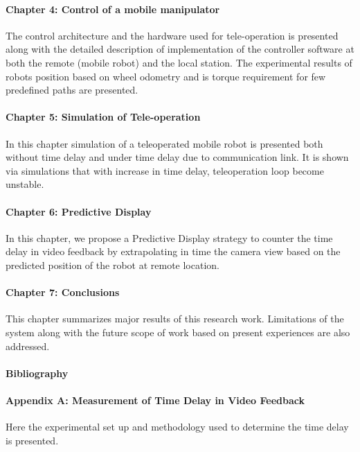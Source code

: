 \paragraph*{Chapter 4: Control of a mobile manipulator \\}
The control architecture and the hardware used for tele-operation is presented along with the detailed description of implementation of the controller software at both the remote (mobile robot)  and the local station. The experimental results of robots position based on wheel odometry and is torque requirement for few predefined paths are presented. 

\paragraph*{Chapter 5: Simulation of Tele-operation \\}
In this chapter simulation of a teleoperated mobile robot is presented both without time delay and  under time delay due to communication link. It is shown via simulations that with increase in time delay,  teleoperation loop become unstable. 
 
\paragraph*{Chapter 6: Predictive Display \\}
In this chapter,  we propose a Predictive Display strategy to counter the time delay in video feedback by extrapolating in time  the camera view based on the predicted position of the robot at remote location. 

\paragraph*{Chapter 7: Conclusions\\}
This chapter summarizes major results of this research work. Limitations of the system along with the future scope of work based on present experiences are also addressed.


\paragraph*{Bibliography}
\paragraph*{Appendix A:  Measurement of Time Delay in Video Feedback  \\}
Here the experimental set up and methodology used to determine the time delay is presented.
